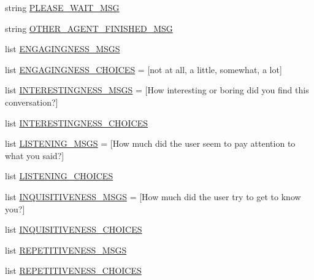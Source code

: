 \begin{DoxyCompactItemize}
string \hyperlink{namespacemturk_1_1worlds_a633a63e2f5ae5198f48f008494263457}{P\+L\+E\+A\+S\+E\+\_\+\+W\+A\+I\+T\+\_\+\+M\+SG}
\item 
string \hyperlink{namespacemturk_1_1worlds_a6ec14ac5caca2a339cfaef5b3abeb59d}{O\+T\+H\+E\+R\+\_\+\+A\+G\+E\+N\+T\+\_\+\+F\+I\+N\+I\+S\+H\+E\+D\+\_\+\+M\+SG}
\item 
list \hyperlink{namespacemturk_1_1worlds_a6e8aeeab9df9ac2e093095ff4a01ec70}{E\+N\+G\+A\+G\+I\+N\+G\+N\+E\+S\+S\+\_\+\+M\+S\+GS}
\item 
list \hyperlink{namespacemturk_1_1worlds_a3b30615ae584ce4de8f4edf2e9dcd598}{E\+N\+G\+A\+G\+I\+N\+G\+N\+E\+S\+S\+\_\+\+C\+H\+O\+I\+C\+ES} = \mbox{[}\textquotesingle{}not at all\textquotesingle{}, \textquotesingle{}a little\textquotesingle{}, \textquotesingle{}somewhat\textquotesingle{}, \textquotesingle{}a lot\textquotesingle{}\mbox{]}
\item 
list \hyperlink{namespacemturk_1_1worlds_ade34bd617d841f748fc0e97c0bd74139}{I\+N\+T\+E\+R\+E\+S\+T\+I\+N\+G\+N\+E\+S\+S\+\_\+\+M\+S\+GS} = \mbox{[}\textquotesingle{}How interesting or boring did you find this conversation?\textquotesingle{}\mbox{]}
\item 
list \hyperlink{namespacemturk_1_1worlds_a87412657b3bb70c05828cec65d50434e}{I\+N\+T\+E\+R\+E\+S\+T\+I\+N\+G\+N\+E\+S\+S\+\_\+\+C\+H\+O\+I\+C\+ES}
\item 
list \hyperlink{namespacemturk_1_1worlds_a25cc504c121e495b794bc274228260f0}{L\+I\+S\+T\+E\+N\+I\+N\+G\+\_\+\+M\+S\+GS} = \mbox{[}\textquotesingle{}How much did the user seem to pay attention to what you said?\textquotesingle{}\mbox{]}
\item 
list \hyperlink{namespacemturk_1_1worlds_a66c071fb0ea81947607647934f5508de}{L\+I\+S\+T\+E\+N\+I\+N\+G\+\_\+\+C\+H\+O\+I\+C\+ES}
\item 
list \hyperlink{namespacemturk_1_1worlds_a86046b763829999c977416bd4f7a5007}{I\+N\+Q\+U\+I\+S\+I\+T\+I\+V\+E\+N\+E\+S\+S\+\_\+\+M\+S\+GS} = \mbox{[}\textquotesingle{}How much did the user try to get to know you?\textquotesingle{}\mbox{]}
\item 
list \hyperlink{namespacemturk_1_1worlds_aee008f1cec91d752fa621e5a4c90868e}{I\+N\+Q\+U\+I\+S\+I\+T\+I\+V\+E\+N\+E\+S\+S\+\_\+\+C\+H\+O\+I\+C\+ES}
\item 
list \hyperlink{namespacemturk_1_1worlds_adb2c239df3437b1df085f4ec2a35a041}{R\+E\+P\+E\+T\+I\+T\+I\+V\+E\+N\+E\+S\+S\+\_\+\+M\+S\+GS}
\item 
list \hyperlink{namespacemturk_1_1worlds_ab33929041c243d9c60ec0697cc9e6344}{R\+E\+P\+E\+T\+I\+T\+I\+V\+E\+N\+E\+S\+S\+\_\+\+C\+H\+O\+I\+C\+ES}

\end{DoxyCompactItemize}
